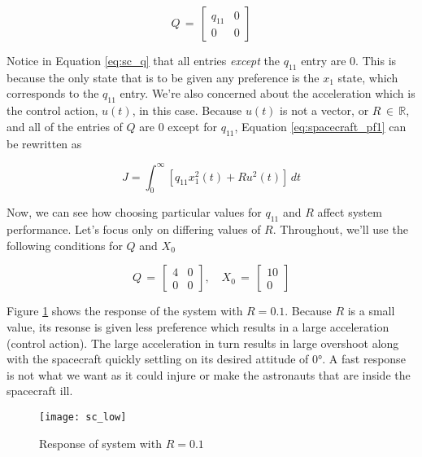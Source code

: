 \begin{equation} \label{eq:sc_q}
    Q \, = \,
    \begin{bmatrix}
        q_{11} & 0 \\
        0      & 0
    \end{bmatrix}
\end{equation}

Notice in Equation \ref{eq:sc_q} that all entries \textit{except} the $q_{11}$
entry are $0$. This is because the only state that is to be given any
preference is the $x_1$ state, which corresponds to the $q_{11}$ entry. We're
also concerned about the acceleration which is the control action, $u(t)$, in
this case. Because $u(t)$ is not a vector, or $R \, \in \, \mathbb{R}$, and all
of the entries of $Q$ are $0$ except for $q_{11}$, Equation
\ref{eq:spacecraft_pf1} can be rewritten as

\begin{equation}
    J = \int_{0}^{\infty} [q_{11} x_1^2(t) + R u^2 (t)] \, dt
    \label{eq:spacecraft_pf2}
\end{equation}

Now, we can see how choosing particular values for $q_{11}$ and $R$ affect
system performance. Let's focus only on differing values of $R$. Throughout,
we'll use the following conditions for $Q$ and $X_0$

\begin{equation} \label{eq:sc_params}
    Q \, = \,
    \begin{bmatrix}
        4 & 0 \\
        0 & 0
    \end{bmatrix}
    , \quad
    X_0 \, = \,
    \begin{bmatrix}
        10 \\
        0
    \end{bmatrix} \nonumber
\end{equation}

Figure \ref{fig:sc_low} shows the response of the system with $R = 0.1$.
Because $R$ is a small value, its resonse is given less preference which
results in a large acceleration (control action). The large acceleration in
turn results in large overshoot along with the spacecraft quickly settling on
its desired attitude of $\ang{0}$. A fast response is not what we want as it
could injure or make the astronauts that are inside the spacecraft ill.

\begin{figure}[H]
    \texttt{[image: sc\_low]}
    \centering
    \caption{Response of system with $R = 0.1$ \cite{kirkdover}}
    \label{fig:sc_low}
\end{figure}

